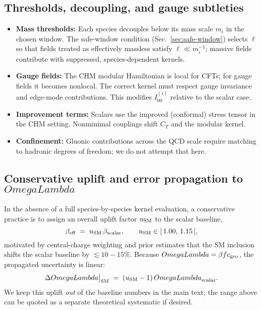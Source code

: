 \documentclass[aps,prd,onecolumn,superscriptaddress,nofootinbib]{revtex4-2}
\def\OmL{OmegaLambda}%
\newcommand{\OmL}{\Omega_\Lambda}
\begin{document}
\subsection{Thresholds, decoupling, and gauge subtleties}
\begin{itemize}[leftmargin=1.3em]
\item \textbf{Mass thresholds:} Each species decouples below its mass scale \(m_i\) in the chosen window. The safe-window condition (Sec.~\ref{sec:safe-window}) selects \(\ell\) so that fields treated as effectively massless satisfy \(\ell\ll m_i^{-1}\); massive fields contribute with suppressed, species-dependent kernels.
\item \textbf{Gauge fields:} The CHM modular Hamiltonian is local for CFTs; for gauge fields it becomes nonlocal. The correct kernel must respect gauge invariance and edge-mode contributions. This modifies \(I_{00}^{(i)}\) relative to the scalar case.
\item \textbf{Improvement terms:} Scalars use the improved (conformal) stress tensor in the CHM setting. Nonminimal couplings shift \(C_T\) and the modular kernel.
\item \textbf{Confinement:} Gluonic contributions across the QCD scale require matching to hadronic degrees of freedom; we do not attempt that here.
\end{itemize}

\subsection{Conservative uplift and error propagation to \texorpdfstring{\(\OmL\)}{OmegaLambda}}
In the absence of a full species-by-species kernel evaluation, a conservative practice is to assign an overall uplift factor \(u_{\rm SM}\) to the scalar baseline,
\begin{equation}
\beta_{\rm eff} \;=\; u_{\rm SM}\,\beta_{\rm scalar},\qquad
u_{\rm SM}\in [\,1.00,\,1.15\,],
\end{equation}
motivated by central-charge weighting and prior estimates that the SM inclusion shifts the scalar baseline by \(\lesssim 10\!-\!15\%\). Because \(\OmL=\beta f c_{\rm geo}\), the propagated uncertainty is linear:
\begin{equation}
\Delta{\OmL}\big|_{\rm SM} \;=\; (u_{\rm SM}-1)\,{\OmL}_{\rm scalar}.
\end{equation}
We keep this uplift \emph{out} of the baseline numbers in the main text; the range above can be quoted as a separate theoretical systematic if desired.
\end{document}
